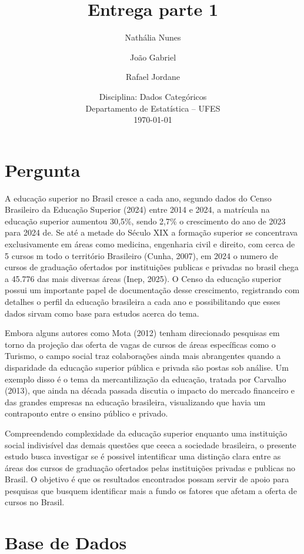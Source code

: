 \documentclass[12pt]{article}
\title{Entrega parte 1}
\author{Nathália Nunes \and João Gabriel \and Rafael Jordane}
\date{Disciplina: Dados Categóricos \\
Departamento de Estatística -- UFES \\
\today}
\begin{document}
\maketitle

\section{Pergunta}

A educação superior no Brasil cresce a cada ano, segundo dados do Censo Brasileiro da Educação Superior (2024) entre 2014 e 2024, a matrícula na educação superior aumentou 30,5\%, sendo 2,7\% o crescimento do ano de 2023 para 2024 de. Se até a metade do Século XIX a formação superior se concentrava exclusivamente em áreas como medicina, engenharia civil e direito, com cerca de 5 cursos m todo o território Brasileiro (Cunha, 2007), em 2024 o numero de cursos de graduação ofertados por instituições publicas e privadas no brasil chega a 45.776 das mais diversas áreas (Inep, 2025). O Censo da educação superior possui um importante papel de documentação desse crescimento, registrando com detalhes o perfil da educação brasileira a cada ano e possibilitando que esses dados sirvam como base para estudos acerca do tema.

Embora alguns autores como Mota (2012) tenham direcionado pesquisas em torno da projeção das oferta de vagas de cursos de áreas específicas como o Turismo, o campo social traz colaborações ainda mais abrangentes quando a disparidade da educação superior pública e privada são postas sob análise. Um exemplo disso é o tema da mercantilização da educação, tratada por Carvalho (2013), que ainda na década passada discutia o impacto do mercado financeiro e das grandes empresas na educação brasileira, visualizando que havia um contraponto entre o ensino público e privado.

Compreendendo complexidade da educação superior enquanto uma instituição social indivisível das demais questões que ceeca a sociedade brasileira, o presente estudo busca investigar se é possivel intentificar uma distinção clara entre as áreas dos cursos de graduação ofertados pelas instituições privadas e publicas no Brasil. O objetivo é que os resultados encontrados possam servir de apoio para pesquisas que busquem identificar mais a fundo os fatores que afetam a oferta de cursos no Brasil.


\section{Base de Dados}
\end{document}
